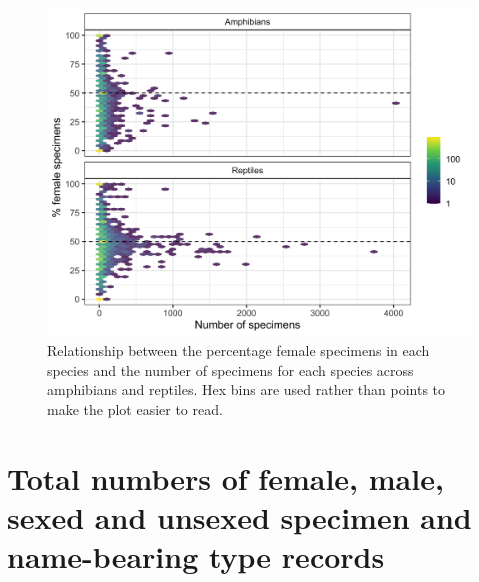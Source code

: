 \documentclass[a4paper, 12pt]{article}
\begin{document}
\begin{figure}[H]
 \centering
  \includegraphics[width = \linewidth]{figures/specimens-numbers-all.png}
  \caption{Relationship between the percentage female specimens in each species and the number of specimens for each species across amphibians and reptiles. 
  Hex bins are used rather than points to make the plot easier to read.}
  \label{fig-hex}
\end{figure}

\newpage
\section{Total numbers of female, male, sexed and unsexed specimen and name-bearing type records}


\newpage
\end{document}
